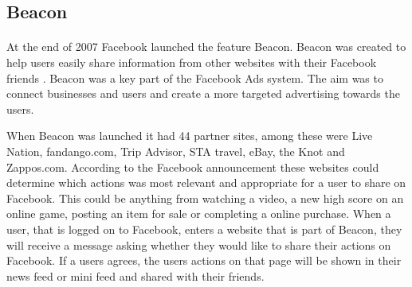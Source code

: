 




\subsection{Beacon}
\paragraph{}
At the end of 2007 Facebook launched the feature Beacon. Beacon was created to help users easily share information from other websites with their Facebook friends \cite{BeaconWebsites}. Beacon was a key part of the Facebook Ads system. The aim was to connect businesses and users and create a more targeted advertising towards the users. 

When Beacon was launched it had 44 partner sites, among these were Live Nation, fandango.com, Trip Advisor, STA travel, eBay, the Knot and Zappos.com. According to the Facebook announcement \cite{BeaconWebsites} these websites could determine which actions was most relevant and appropriate for a user to share on Facebook. This could be anything from watching a video, a new high score on an online game, posting an item for sale or completing a online purchase. When a user, that is logged on to Facebook, enters a website that is part of Beacon, they will receive a message asking whether they would like to share their actions on Facebook. If a users agrees, the users actions on that page will be shown in their news feed or mini feed and shared with their friends.  

